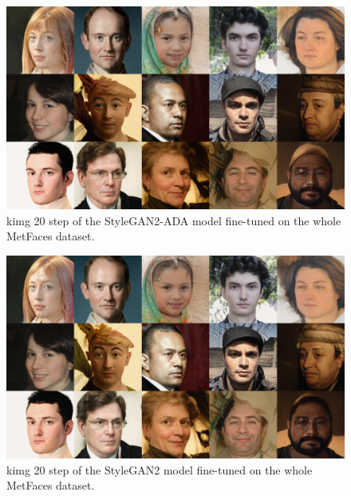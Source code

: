 \documentclass[conference]{IEEEtran}
\begin{document}


\nocite{*}

\vspace{12pt}


\appendix

\begin{figure}[!h]
	\begin{center}
		\includegraphics[width=0.8\columnwidth]{./images/picked_images/stylegan2_ADA_step_20_full_dataset.png}
		\caption{kimg 20 step of the StyleGAN2-ADA model fine-tuned on the whole MetFaces dataset.}
		\label{fig:figure10}
	\end{center}
\end{figure}


\begin{figure}[!h]
	\begin{center}
		\includegraphics[width=0.8\columnwidth]{./images/picked_images/stylegan2_step_20_full_dataset.png}
		\caption{kimg 20 step of the StyleGAN2 model fine-tuned on the whole MetFaces dataset.}
		\label{fig:figure11}
	\end{center}
\end{figure}
\end{document}
